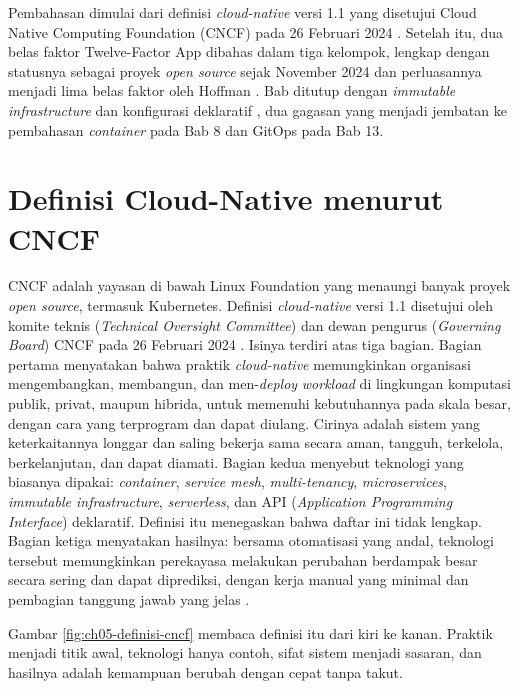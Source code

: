 Pembahasan dimulai dari definisi \textit{cloud-native} versi 1.1 yang disetujui Cloud
Native Computing Foundation (CNCF) pada 26 Februari 2024 \cite{cncf-definition}. Setelah
itu, dua belas faktor Twelve-Factor App \cite{twelvefactor} dibahas dalam tiga kelompok,
lengkap dengan statusnya sebagai proyek \textit{open source} sejak November 2024
\cite{c05-heroku2024} dan perluasannya menjadi lima belas faktor oleh Hoffman
\cite{c05-hoffman2016}. Bab ditutup dengan \textit{immutable infrastructure} dan
konfigurasi deklaratif \cite{c05-morris-immutable,c05-k8s-object-management}, dua gagasan
yang menjadi jembatan ke pembahasan \textit{container} pada Bab 8 dan GitOps pada Bab 13.

\section{Definisi Cloud-Native menurut CNCF}
\label{sec:ch05-definisi}

CNCF adalah yayasan di bawah Linux Foundation yang menaungi banyak proyek \textit{open
source}, termasuk Kubernetes. Definisi \textit{cloud-native} versi 1.1 disetujui oleh
komite teknis (\textit{Technical Oversight Committee}) dan dewan pengurus
(\textit{Governing Board}) CNCF pada 26 Februari 2024 \cite{cncf-definition}. Isinya
terdiri atas tiga bagian. Bagian pertama menyatakan bahwa praktik \textit{cloud-native}
memungkinkan organisasi mengembangkan, membangun, dan men-\textit{deploy}
\textit{workload} di lingkungan komputasi publik, privat, maupun hibrida, untuk memenuhi
kebutuhannya pada skala besar, dengan cara yang terprogram dan dapat diulang. Cirinya adalah
sistem yang keterkaitannya longgar dan saling bekerja sama secara aman, tangguh, terkelola,
berkelanjutan, dan dapat diamati. Bagian kedua menyebut teknologi yang biasanya dipakai:
\textit{container}, \textit{service mesh}, \textit{multi-tenancy}, \textit{microservices},
\textit{immutable infrastructure}, \textit{serverless}, dan API (\textit{Application
Programming Interface}) deklaratif. Definisi itu menegaskan bahwa daftar ini tidak lengkap.
Bagian ketiga menyatakan hasilnya: bersama otomatisasi yang andal, teknologi tersebut
memungkinkan perekayasa melakukan perubahan berdampak besar secara sering dan dapat
diprediksi, dengan kerja manual yang minimal dan pembagian tanggung jawab yang jelas
\cite{cncf-definition}.

Gambar \ref{fig:ch05-definisi-cncf} membaca definisi itu dari kiri ke kanan. Praktik
menjadi titik awal, teknologi hanya contoh, sifat sistem menjadi sasaran, dan hasilnya
adalah kemampuan berubah dengan cepat tanpa takut.

